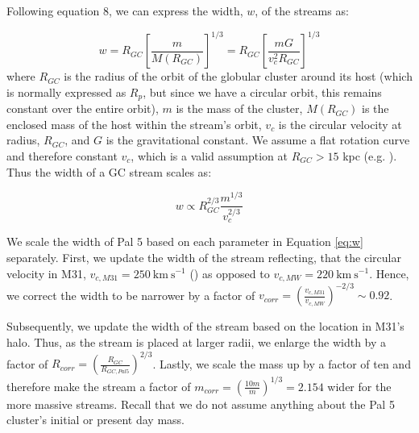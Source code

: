 \documentclass[twocolumn]{aastex62}
\newcommand{\kms}{\ensuremath{\textrm{km}~\textrm{s}^{-1}}}
\begin{document}
Following \citet{johnston01} equation 8, we can express the width, $w$, of the streams as:

\begin{equation}
w = R_{GC} \left[\frac{m}{M(R_{GC})}\right]^{1/3} = R_{GC} \left[\frac{m G}{v_c^2 R_{GC}}\right]^{1/3} 
\end{equation}
where $R_{GC}$ is the radius of the orbit of the globular cluster around its host (which is normally expressed as $R_p$, but since we have a circular orbit, this remains constant over the entire orbit), $m$ is the mass of the cluster, $M(R_{GC})$ is the enclosed mass of the host within the stream's orbit, $v_c$ is the circular velocity at radius, $R_{GC}$, and $G$ is the gravitational constant. We assume a flat rotation curve and therefore constant  $v_c$, which is a valid assumption at $R_{GC} > 15$ kpc (e.g. \citealt{chemin09}). Thus the width of a GC stream scales as:

\begin{equation}
\label{eq:w}
w \propto R_{GC}^{2/3} \frac{m^{1/3}}{v_c^{2/3}}
\end{equation}

We scale the width of Pal 5 based on each parameter in Equation \ref{eq:w} separately. First, we update the width of the stream reflecting, that the circular velocity in M31, $v_{c, M31}= 250 ~\kms$  (\citealt{chemin09}) as opposed to  $v_{c, MW}= 220 ~\kms$. Hence, we correct the width to be narrower by a factor of $v_{corr} =  \left(\frac{v_{c,M31}}{v_{c,MW}}\right)^{-2/3} \sim 0.92$. 

Subsequently, we update the width of the stream based on the location in M31's halo. Thus, as the stream is placed at larger radii, we enlarge the width by a factor of  $R_{corr} = \left(\frac{R_{GC}}{R_{GC,Pal5}}\right)^{2/3}$. Lastly, we scale the mass up by a factor of ten and therefore make the stream a factor of $m_{corr} = \left(\frac{10m}{m}\right)^{1/3}= 2.154$ wider for the more massive streams. Recall that we do not assume anything about the Pal 5 cluster's initial or present day mass. 
\end{document}
